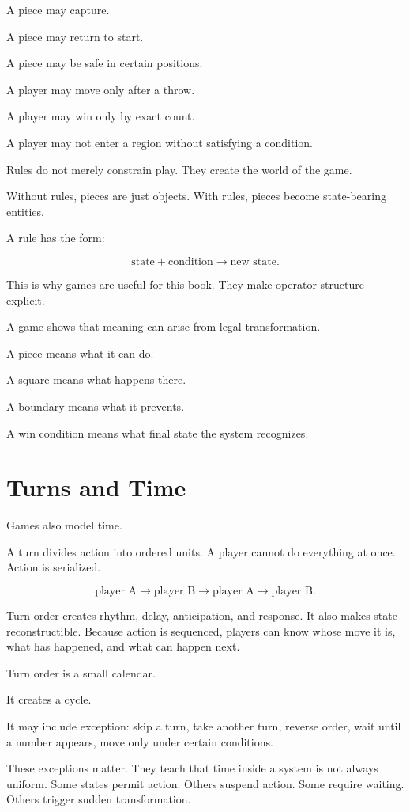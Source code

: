 \documentclass[11pt]{book}
\begin{document}
A piece may capture.

A piece may return to start.

A piece may be safe in certain positions.

A player may move only after a throw.

A player may win only by exact count.

A player may not enter a region without satisfying a condition.

Rules do not merely constrain play. They create the world of the game.

Without rules, pieces are just objects. With rules, pieces become state-bearing entities.

A rule has the form:

\[
\text{state} + \text{condition} \rightarrow \text{new state}.
\]

This is why games are useful for this book. They make operator structure explicit.

A game shows that meaning can arise from legal transformation.

A piece means what it can do.

A square means what happens there.

A boundary means what it prevents.

A win condition means what final state the system recognizes.

\section{Turns and Time}

Games also model time.

A turn divides action into ordered units. A player cannot do everything at once. Action is serialized.

\[
\text{player A}
\rightarrow
\text{player B}
\rightarrow
\text{player A}
\rightarrow
\text{player B}.
\]

Turn order creates rhythm, delay, anticipation, and response. It also makes state reconstructible. Because action is sequenced, players can know whose move it is, what has happened, and what can happen next.

Turn order is a small calendar.

It creates a cycle.

It may include exception: skip a turn, take another turn, reverse order, wait until a number appears, move only under certain conditions.

These exceptions matter. They teach that time inside a system is not always uniform. Some states permit action. Others suspend action. Some require waiting. Others trigger sudden transformation.
\end{document}
